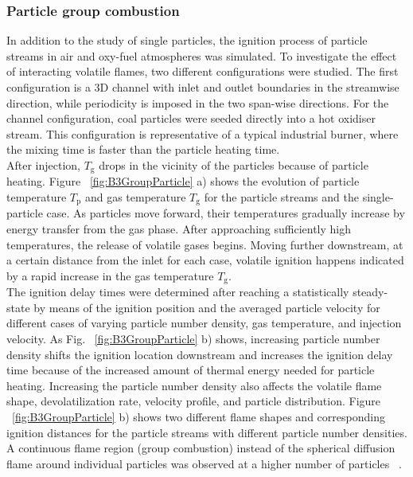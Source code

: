 \begin{btUnit}
\subsubsection{Particle group combustion}
In addition to the study of single particles, the ignition process of particle streams in air and oxy-fuel atmospheres was simulated. To investigate the effect of interacting volatile flames, two different configurations were studied. The first configuration is a 3D channel with inlet and outlet boundaries in the streamwise direction, while periodicity is imposed in the two span-wise directions. For the channel configuration, coal particles were seeded directly into a hot oxidiser stream. This configuration is representative of a typical industrial burner, where the mixing time is faster than the particle heating time.
\\
After injection, $T_\mathrm{g}$ drops in the vicinity of the particles because of particle heating. Figure ~\ref{fig:B3GroupParticle} a) shows the evolution of particle temperature $T_\mathrm{p}$ and gas temperature $T_\mathrm{g}$ for the particle streams and the single-particle case. As particles move forward, their temperatures gradually increase by energy transfer from the gas phase. After approaching sufficiently high temperatures, the release of volatile gases begins. Moving further downstream, at a certain distance from the inlet for each case, volatile ignition happens indicated by a rapid increase in the gas temperature $T_\mathrm{g}$.
\\
The ignition delay times were determined after reaching a statistically steady-state by means of the ignition position and the averaged particle velocity for different cases of varying particle number density, gas temperature, and injection velocity. As Fig. ~\ref{fig:B3GroupParticle} b) shows, increasing particle number density shifts the ignition location downstream and increases the ignition delay time because of the increased amount of thermal energy needed for particle heating. Increasing the particle number density also affects the volatile flame shape, devolatilization rate, velocity profile, and particle distribution. Figure ~\ref{fig:B3GroupParticle} b) shows two different flame shapes and corresponding ignition distances for the particle streams with different particle number densities. A continuous flame region (group combustion) instead of the spherical diffusion flame around individual particles was observed at a higher number of particles ~\cite{Farazi2019b}.
\\

\end{btUnit}
